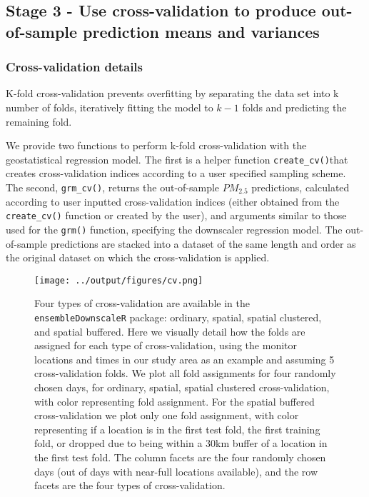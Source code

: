 \subsection*{Stage 3 - Use cross-validation to produce out-of-sample prediction means and variances}

\subsubsection*{Cross-validation details}

K-fold cross-validation prevents overfitting by separating the data set into k number of folds, iteratively fitting the model to $k-1$ folds and predicting the remaining fold.

We provide two functions to perform k-fold cross-validation with the geostatistical regression model. 
The first is a helper function \texttt{create\_cv()}that creates cross-validation indices according to a user specified sampling scheme. 
The second, \texttt{grm\_cv()}, returns the out-of-sample $PM_{2.5}$ predictions, calculated according to user inputted cross-validation indices (either obtained from the \texttt{create\_cv()} function or created by the user), and arguments similar to those used for the \texttt{grm()} function, specifying the downscaler regression model. 
The out-of-sample predictions are stacked into a dataset of the same length and order as the original dataset on which the cross-validation is applied.

\begin{figure}[ht]
    \centering
    \texttt{[image: ../output/figures/cv.png]}
    \caption{Four types of cross-validation are available in the \texttt{ensembleDownscaleR} package: ordinary, spatial, spatial clustered, and spatial buffered.
    Here we visually detail how the folds are assigned for each type of cross-validation, using the monitor locations and times in our study area as an example and assuming 5 cross-validation folds. 
    We plot all fold assignments for four randomly chosen days, for ordinary, spatial, spatial clustered cross-validation, with color representing fold assignment.
    For the spatial buffered cross-validation we plot only one fold assignment, with color representing if a location is in the first test fold, the first training fold, or dropped due to being within a 30km buffer of a location in the first test fold.
    The column facets are the four randomly chosen days (out of days with near-full locations available), and the row facets are the four types of cross-validation.}
    \label{fig:cvtypes}
\end{figure}

